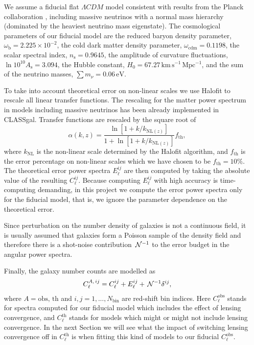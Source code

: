 We assume a fiducial flat $\Lambda CDM$ model consistent with results from the Planck collaboration , including massive neutrinos with a normal mass hierarchy (dominated by the heaviest neutrino mass eigenstate). The cosmological parameters of our fiducial model are the reduced baryon density parameter, $\omega_{\mathrm{b}} = 2.225\times 10^{-2}$, the cold dark matter density parameter, $\omega_{\mathrm{cdm}}=0.1198$, the scalar spectral index, $n_{\mathrm{s}}=0.9645$, the amplitude of curvature fluctuations, $\ln 10^{10} A_{\mathrm{s}}=3.094$, the Hubble constant, $H_0 = 67.27\, \mathrm{km\, s^{-1}\, Mpc^{-1}}$, and the sum of the neutrino masses, $\sum m_\nu = 0.06\, \mathrm{eV}$.  
     
To take into account theoretical error on non-linear scales we use Halofit  to rescale all linear transfer functions. The rescaling for the matter power spectrum in models including massive neutrinos has been already implemented in CLASSgal. Transfer functions are rescaled by the square root of 
\begin{equation}
\alpha(k,z) = \frac{\ln [1 + k/k_{\mathrm{NL}(z)}]}{1 + \ln [1 + k/k_{\mathrm{NL}(z)}]}f_{\mathrm{th}},
\label{Eq:rescaling-factor-transfer-functions}
\end{equation}
where $k_{\mathrm{NL}}$ is the non-linear scale determined by the Halofit algorithm, and $f_{\mathrm{th}}$ is the error percentage on non-linear scales which we have chosen to be $f_{\mathrm{th}}=10\%$. The theoretical error power spectra $E_\ell^{ij}$ are then computed by taking the absolute value of the resulting $C_\ell^{ij}$. Because computing $E_\ell^{ij}$ with high accuracy is time-computing demanding, in this project we compute the error power spectra only for the fiducial model, that is, we ignore the parameter dependence on the theoretical error.

Since perturbation on the number density of galaxies is not a continuous field, it is usually assumed that galaxies form a Poisson sample of the density field  and therefore there is a shot-noise contribution $\,{\mathcal N}^{-1}$ to the error budget in the angular power spectra.

Finally, the galaxy number counts are modelled as 
\begin{equation}
\label{Eq:GNC-modelled-angular-power-spectra}
C_\ell^{A,\,ij} = C_\ell^{ij} + E_\ell^{ij} + \,{\mathcal N}^{-1} \delta^{ij},
\end{equation}
where $A=\mathrm{obs},\,\mathrm{th}$ and $i,j = 1,...,N_{\mathrm{bin}}$ are red-shift bin indices. Here $C_\ell^{\mathrm{obs}}$ stands for spectra computed for our fiducial model which includes the effect of lensing convergence, and $C_\ell^{\mathrm{th}}$ stands for models which might or might not include lensing convergence. In the next Section we will see what the impact of switching lensing convergence off in $C_\ell^{\mathrm{th}}$ is when fitting this kind of models to our fiducial $C_\ell^{\mathrm{obs}}$.   
     
